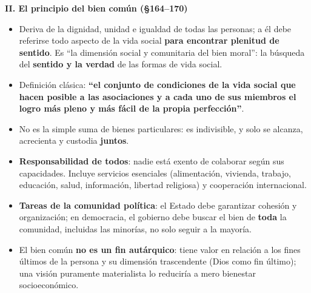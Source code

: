 \documentclass[10pt,a4paper]{article}
\begin{document}
\medskip\noindent \textbf{II. El principio del bien común (\S{}164--170)}\par\nopagebreak
\begin{itemize}
\item Deriva de la dignidad, unidad e igualdad de todas las personas; a él debe referirse todo aspecto de la vida social \textbf{para encontrar plenitud de sentido}. Es ``la dimensión social y comunitaria del bien moral'': la búsqueda del \textbf{sentido y la verdad} de las formas de vida social.
\item Definición clásica: \textbf{``el conjunto de condiciones de la vida social que hacen posible a las asociaciones y a cada uno de sus miembros el logro más pleno y más fácil de la propia perfección''}.
\item No es la simple suma de bienes particulares: es indivisible, y solo se alcanza, acrecienta y custodia \textbf{juntos}.
\item \textbf{Responsabilidad de todos}: nadie está exento de colaborar según sus capacidades. Incluye servicios esenciales (alimentación, vivienda, trabajo, educación, salud, información, libertad religiosa) y cooperación internacional.
\item \textbf{Tareas de la comunidad política}: el Estado debe garantizar cohesión y organización; en democracia, el gobierno debe buscar el bien de \textbf{toda} la comunidad, incluidas las minorías, no solo seguir a la mayoría.
\item El bien común \textbf{no es un fin autárquico}: tiene valor en relación a los fines últimos de la persona y su dimensión trascendente (Dios como fin último); una visión puramente materialista lo reduciría a mero bienestar socioeconómico.
\end{itemize}
\end{document}
